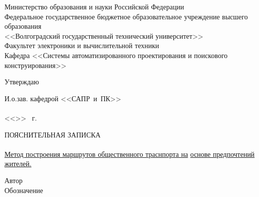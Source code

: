 \begin{titlepage}
    \begin{center}
        Министерство образования и науки Российской Федерации \\
        Федеральное государственное бюджетное образовательное учреждение высшего образования\\
        <<Волгоградский государственный технический университет>>\\
        Факультет электроники и вычислительной техники\\
        Кафедра <<Системы автоматизированного проектирования и поискового конструирования>>
    \end{center}
    \begin{flushright}
        \begin{center}
            \hspace*{9.7em}Утверждаю
        \end{center}
        И.о.зав. кафедрой <<САПР~и~ПК>>\\
        \hspace{0.5em}\\
        \vspace{0.5em}<<\underline{\hspace{2.5em}}>> \underline{\hspace{8.5em}} \the\year\ г.
    \end{flushright}
    \begin{center}
        \large ПОЯСНИТЕЛЬНАЯ ЗАПИСКА\\
            {}\\
        \underline{Метод построения маршрутов общественного траснпорта на\hspace{2em}}
        \underline{основе предпочтений жителей.\hspace{0.525\textwidth}}
    \end{center}
    Автор  \quad 
    \\
    Обозначение \UNDER{\underline{\smash{\hspace{6em}\MASTERWORK\hspace{9.2em}}}}

\end{titlepage}
